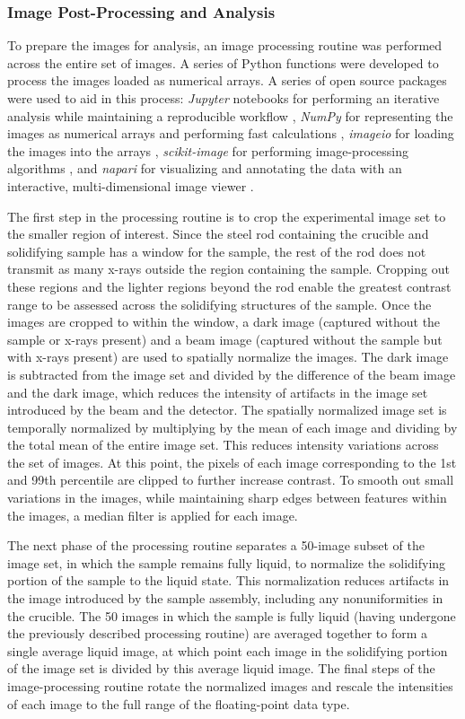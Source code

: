 \subsubsection{Image Post-Processing and Analysis}
To prepare the images for analysis, an image processing routine was
performed across the entire set of images. A series of Python functions
were developed to process the images loaded as numerical arrays. A series
of open source packages were used to aid in this process: \textit{Jupyter}
notebooks for performing an iterative analysis while maintaining a
reproducible workflow \cite{jupyter},
\textit{NumPy} for representing the images as
numerical arrays and performing fast calculations \cite{numpy},
\textit{imageio} for loading the images into the arrays \cite{imageio},
\textit{scikit-image} for performing image-processing algorithms \cite{skimage},
and \textit{napari} for visualizing and annotating the data with an
interactive, multi-dimensional image viewer \cite{napari}.

The first step in the processing routine is to crop the experimental image
set to the smaller region of interest. Since the steel rod containing the
crucible and solidifying sample has a window for the sample, the rest of
the rod does not transmit as many x-rays outside the region containing the
sample. Cropping out these regions and the lighter regions beyond the rod
enable the greatest contrast range to be assessed across the solidifying
structures of the sample. Once the images are cropped to within the
window, a dark image (captured without the sample or x-rays present) and a
beam image (captured without the sample but with x-rays present) are used
to spatially normalize the images. The dark image is subtracted from the
image set and divided by the difference of the beam image and the dark
image, which reduces the intensity of artifacts in the image set
introduced by the beam and the detector. The spatially normalized image
set is temporally normalized by multiplying by the mean of each image and
dividing by the total mean of the entire image set. This reduces intensity
variations across the set of images. At this point, the pixels of each
image corresponding to the 1st and 99th percentile are clipped to further
increase contrast. To smooth out small variations in the images, while
maintaining sharp edges between features within the images, a median
filter is applied for each image.

The next phase of the processing routine separates a 50-image subset of
the image set, in which the sample remains fully liquid, to normalize the
solidifying portion of the sample to the liquid state. This normalization
reduces artifacts in the image introduced by the sample assembly,
including any nonuniformities in the crucible. The 50 images in which the
sample is fully liquid (having undergone the previously described
processing routine) are averaged together to form a single average liquid
image, at which point each image in the solidifying portion of the image
set is divided by this average liquid image. The final steps of the
image-processing routine rotate the normalized images and rescale the
intensities of each image to the full range of the floating-point data
type.

